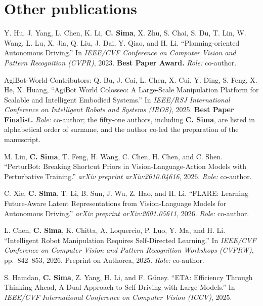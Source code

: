 \section*{Other publications}

\begin{enumerate}[label={[\arabic*]}, leftmargin=*, itemsep=4pt, resume]
  \item Y. Hu, J. Yang, L. Chen, K. Li, \textbf{C. Sima}, X. Zhu, S. Chai, S. Du, T. Lin, W. Wang, L. Lu, X. Jia, Q. Liu, J. Dai, Y. Qiao, and H. Li.
        ``Planning-oriented Autonomous Driving.''
        In \emph{IEEE/CVF Conference on Computer Vision and Pattern Recognition (CVPR)}, 2023. \textbf{Best Paper Award.}
        \emph{Role:} co-author.
  \item AgiBot-World-Contributors: Q. Bu, J. Cai, L. Chen, X. Cui, Y. Ding, S. Feng, X. He, X. Huang, \etal
        ``AgiBot World Colosseo: A Large-Scale Manipulation Platform for Scalable and Intelligent Embodied Systems.''
        In \emph{IEEE/RSJ International Conference on Intelligent Robots and Systems (IROS)}, 2025. \textbf{Best Paper Finalist.}
        \emph{Role:} co-author; the fifty-one authors, including \textbf{C. Sima}, are listed in alphabetical order of surname, and the author co-led the preparation of the manuscript.
  \item M. Liu, \textbf{C. Sima}, T. Feng, H. Wang, C. Chen, H. Chen, and C. Shen.
        ``PerturBot: Breaking Shortcut Priors in Vision-Language-Action Models with Perturbative Training.''
        \emph{arXiv preprint arXiv:2610.04616}, 2026.
        \emph{Role:} co-author.
  \item C. Xie, \textbf{C. Sima}, T. Li, B. Sun, J. Wu, Z. Hao, and H. Li.
        ``FLARE: Learning Future-Aware Latent Representations from Vision-Language Models for Autonomous Driving.''
        \emph{arXiv preprint arXiv:2601.05611}, 2026.
        \emph{Role:} co-author.
  \item L. Chen, \textbf{C. Sima}, K. Chitta, A. Loquercio, P. Luo, Y. Ma, and H. Li.
        ``Intelligent Robot Manipulation Requires Self-Directed Learning.''
        In \emph{IEEE/CVF Conference on Computer Vision and Pattern Recognition Workshops (CVPRW)}, pp.~842--853, 2026. Preprint on Authorea, 2025.
        \emph{Role:} co-author.
  \item S. Hamdan, \textbf{C. Sima}, Z. Yang, H. Li, and F. G{\"u}ney.
        ``ETA: Efficiency Through Thinking Ahead, A Dual Approach to Self-Driving with Large Models.''
        In \emph{IEEE/CVF International Conference on Computer Vision (ICCV)}, 2025.

\end{enumerate}
